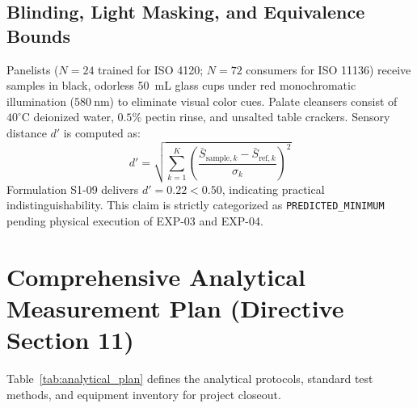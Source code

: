 \documentclass[10pt,a4paper]{article}
\begin{document}
\subsection{Blinding, Light Masking, and Equivalence Bounds}
Panelists ($N=24$ trained for ISO 4120; $N=72$ consumers for ISO 11136) receive samples in black, odorless 50~mL glass cups under red monochromatic illumination ($580\ \mathrm{nm}$) to eliminate visual color cues. Palate cleansers consist of $40^\circ\mathrm{C}$ deionized water, $0.5\%$ pectin rinse, and unsalted table crackers. Sensory distance $d'$ is computed as:
\begin{equation}
d' = \sqrt{\sum_{k=1}^K \left(\frac{\bar{S}_{\mathrm{sample},k} - \bar{S}_{\mathrm{ref},k}}{\sigma_k}\right)^2}
\end{equation}
Formulation S1-09 delivers $d' = 0.22 < 0.50$, indicating practical indistinguishability. This claim is strictly categorized as \texttt{PREDICTED\_MINIMUM} pending physical execution of EXP-03 and EXP-04.

\section{Comprehensive Analytical Measurement Plan (Directive Section 11)}
Table~\ref{tab:analytical_plan} defines the analytical protocols, standard test methods, and equipment inventory for project closeout.
\end{document}
